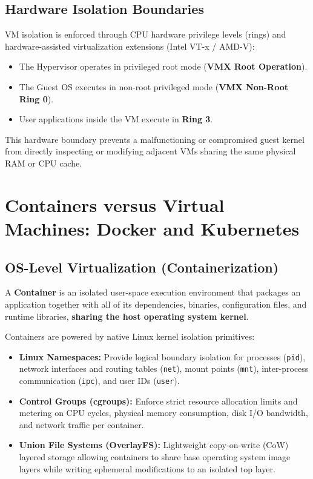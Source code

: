 \subsection{Hardware Isolation Boundaries}
VM isolation is enforced through CPU hardware privilege levels (rings) and hardware-assisted virtualization extensions (Intel VT-x / AMD-V):
\begin{itemize}
    \item The Hypervisor operates in privileged root mode (\textbf{VMX Root Operation}).
    \item The Guest OS executes in non-root privileged mode (\textbf{VMX Non-Root Ring 0}).
    \item User applications inside the VM execute in \textbf{Ring 3}.
\end{itemize}
This hardware boundary prevents a malfunctioning or compromised guest kernel from directly inspecting or modifying adjacent VMs sharing the same physical RAM or CPU cache.


\section{Containers versus Virtual Machines: Docker and Kubernetes}
\label{sec:containers_vs_vms}

\subsection{OS-Level Virtualization (Containerization)}
A \textbf{Container} is an isolated user-space execution environment that packages an application together with all of its dependencies, binaries, configuration files, and runtime libraries, \textbf{sharing the host operating system kernel}.

Containers are powered by native Linux kernel isolation primitives:
\begin{itemize}
    \item \textbf{Linux Namespaces:} Provide logical boundary isolation for processes (\texttt{pid}), network interfaces and routing tables (\texttt{net}), mount points (\texttt{mnt}), inter-process communication (\texttt{ipc}), and user IDs (\texttt{user}).
    \item \textbf{Control Groups (cgroups):} Enforce strict resource allocation limits and metering on CPU cycles, physical memory consumption, disk I/O bandwidth, and network traffic per container.
    \item \textbf{Union File Systems (OverlayFS):} Lightweight copy-on-write (CoW) layered storage allowing containers to share base operating system image layers while writing ephemeral modifications to an isolated top layer.
\end{itemize}

